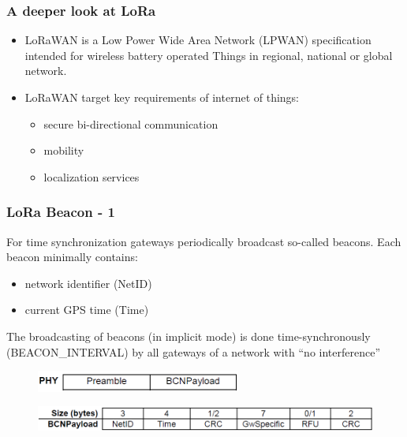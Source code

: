 \begin{frame}[fragile]
  \frametitle{A deeper look at LoRa}
  \begin{itemize}
      \item LoRaWAN is a Low Power Wide Area Network (LPWAN) specification intended for wireless battery operated Things in regional, national or global network. 
      \item LoRaWAN target key requirements of internet of things:
      \begin{itemize}
      	\item secure bi-directional communication
      	\item mobility
      	\item localization services 
      \end{itemize}
  \end{itemize}
\end{frame}

\begin{frame}[fragile]
  \frametitle{LoRa Beacon - 1}
  For time synchronization gateways periodically broadcast so-called beacons. Each beacon
  minimally contains:
  \begin{itemize}
      \item network identifier (NetID)
      \item current GPS time (Time)
      \end{itemize}
      The broadcasting of beacons (in implicit mode) is done time-synchronously (BEACON\_INTERVAL) by all gateways of a network with \textquotedblleft no interference\textquotedblright
      \begin{figure}
  \centering
  \includegraphics[width=0.6\textwidth]{img/general_lora_beaconing.png}
\end{figure}
  \begin{figure}
  	\centering
  \includegraphics[width=\textwidth]{img/lora_beaconing.png}
  \end{figure}
\end{frame}

